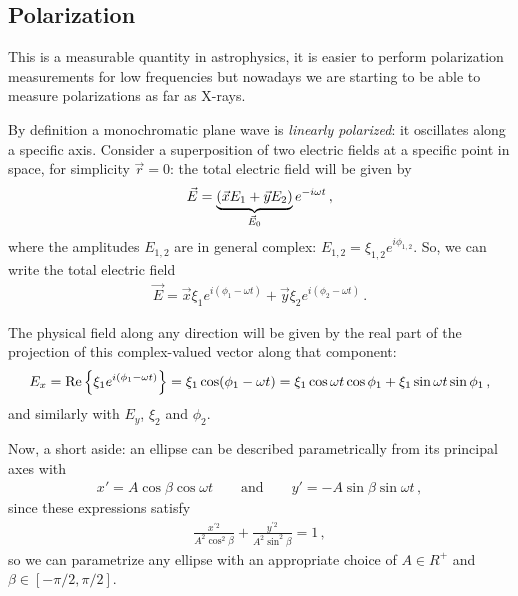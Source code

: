 \documentclass[main.tex]{subfiles}
\begin{document}
\subsection{Polarization}

This is a measurable quantity in astrophysics, it is easier to perform polarization measurements for low frequencies but nowadays we are starting to be able to measure polarizations as far as X-rays. 

By definition a monochromatic plane wave is \emph{linearly polarized}: it oscillates along a specific axis. 
Consider a superposition of two electric fields at a specific point in space, for simplicity \(\vec{r} = 0 \): the total electric field will be given by 
%
\begin{align}
\vec{E} = \underbrace{\qty(\vec{x} E_1 + \vec{y} E_2 )}_{\vec{E}_0 } e^{-i \omega t}
\,,
\end{align}
%
where the amplitudes \(E_{1,2} \) are in general complex: \(E_{1, 2} = \xi_{1, 2} e^{i \phi_{1,2} }\). So, we can write the total electric field 
%
\begin{align}
\vec{E} = 
\vec{x} \xi_1 e^{i (\phi_1 - \omega t)}
+
\vec{y} \xi_2 e^{i (\phi_2 - \omega t)}
\,.
\end{align}

The physical field along any direction will be given by the real part of the projection of this complex-valued vector along that component: 
%
\begin{align}
E_x = \Re \qty{\xi_1 e^{i (\phi_1 - \omega t)}} = \xi_1 \cos(\phi_1 - \omega t)
= \xi_1 \cos \omega t  \cos \phi_1 + \xi_1 \sin \omega t \sin \phi_1 
\,,
\end{align}
%
and similarly with \(E_y\), \(\xi_2\) and \(\phi_2 \). 

Now, a short aside: an ellipse can be described parametrically from its principal axes with 
%
\begin{align}
x' = A \cos \beta \cos \omega t
\qquad \text{and} \qquad
y' = - A \sin \beta \sin \omega t
\,,
\end{align}
%
since these expressions satisfy 
%
\begin{align}
\frac{x^{\prime 2} }{A^2 \cos^2\beta }
+\frac{y^{\prime 2} }{A^2 \sin^2\beta }
= 1
\,,
\end{align}
%
so we can parametrize any ellipse with an appropriate choice of \(A \in R^{+}\) and \(\beta \in [- \pi /2, \pi /2]\). 
\end{document}
